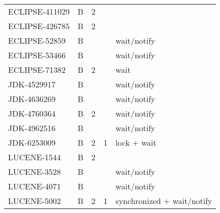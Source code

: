 \begin{table}[!htp]
{\begin{tabular}{lllll}
    ECLIPSE-411029 & B        & 2             & ~               & ~                                           \\
    ECLIPSE-426785 & B        & 2             & ~               & ~                                           \\
    ECLIPSE-52859  & B        & ~             & ~               & wait/notify                                 \\
    ECLIPSE-53466  & B        & ~             & ~               & wait/notify                                 \\
    ECLIPSE-71382  & B        & 2             & ~               & wait                                        \\
    JDK-4529917    & B        & ~             & ~               & wait/notify                                 \\
    JDK-4636269    & B        & ~             & ~               & wait/notify                                 \\
    JDK-4760364    & B        & 2             & ~               & wait/notify                                 \\
    JDK-4962516    & B        & ~             & ~               & wait/notify                                 \\
    JDK-6253009    & B        & 2             & 1               & lock + wait                                 \\
    LUCENE-1544    & B        & 2             & ~               & ~                                           \\
    LUCENE-3528    & B        & ~             & ~               & wait/notify                                 \\
    LUCENE-4071    & B        & ~             & ~               & wait/notify                                 \\
    LUCENE-5002    & B        & 2             & 1               & synchronized + wait/notify                  \\
	\bottomrule
	\end{tabular}
	}
\end{table}

